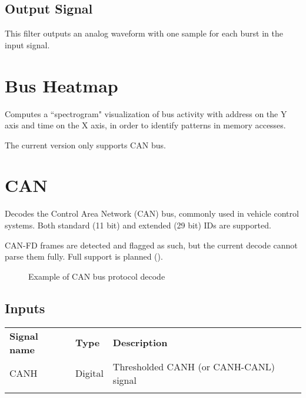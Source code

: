 \subsection{Output Signal}

This filter outputs an analog waveform with one sample for each burst in the input signal.

\pagebreak
\section{Bus Heatmap}

Computes a ``spectrogram" visualization of bus activity with address on the Y axis and time on the X axis, in order to
identify patterns in memory accesses.

The current version only supports CAN bus.

\pagebreak
\section{CAN}
\label{filter:can}

Decodes the Control Area Network (CAN) bus, commonly used in vehicle control systems. Both standard (11 bit) and
extended (29 bit) IDs are supported.

CAN-FD frames are detected and flagged as such, but the current decode cannot parse them fully. Full support is planned
().

\begin{figure}[h]
\centering
{}
\caption{Example of CAN bus protocol decode}
\label{filter_can}
\end{figure}

\subsection{Inputs}

\begin{tabularx}{16cm}{llX}
\thickhline
\textbf{Signal name} & \textbf{Type} & \textbf{Description} \\
\thickhline
CANH & Digital & Thresholded CANH (or CANH-CANL) signal \\
\thickhline
\end{tabularx}


